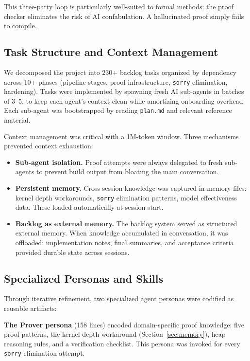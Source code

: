 \documentclass[sigconf,nonacm,screen]{acmart}
\begin{document}
This three-party loop is particularly well-suited to formal methods:
the proof checker eliminates the risk of AI confabulation. A
hallucinated proof simply fails to compile.

\subsection{Task Structure and Context Management}

We decomposed the project into 230+ backlog tasks organized by
dependency across 10+ phases (pipeline stages, proof infrastructure,
\texttt{sorry} elimination, hardening). Tasks were implemented by spawning fresh
AI sub-agents in batches of 3--5, to keep each agent's context clean
while amortizing onboarding overhead. Each sub-agent was bootstrapped
by reading \texttt{plan.md} and relevant reference material.

Context management was critical with a 1M-token window. Three
mechanisms prevented context exhaustion:

\begin{itemize}
\item \textbf{Sub-agent isolation.} Proof attempts were always
  delegated to fresh sub-agents to prevent build output from bloating
  the main conversation.
\item \textbf{Persistent memory.} Cross-session knowledge was captured
  in memory files: kernel depth workarounds, \texttt{sorry} elimination
  patterns, model effectiveness data. These loaded automatically at
  session start.
\item \textbf{Backlog as external memory.} The backlog system served as
  structured external memory. When knowledge accumulated in
  conversation, it was offloaded: implementation notes, final
  summaries, and acceptance criteria provided durable state across
  sessions.
\end{itemize}

\subsection{Specialized Personas and Skills}

Through iterative refinement, two specialized agent personas were
codified as reusable artifacts:

\textbf{The Prover persona} (158 lines) encoded domain-specific proof
knowledge: five proof patterns, the kernel depth workaround
(Section~\ref{sec:memory}), heap reasoning rules, and a verification checklist.
This persona was invoked for every \texttt{sorry}-elimination attempt.
\end{document}
